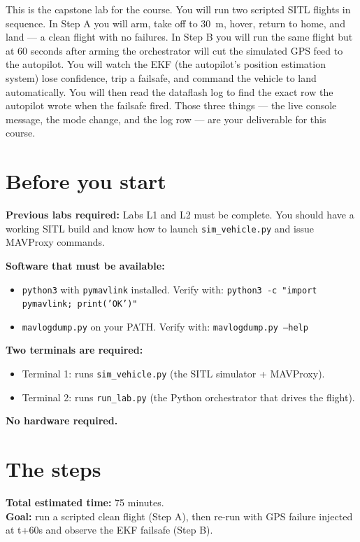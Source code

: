\documentclass[a4paper,11pt,twoside]{article}
\begin{document}
This is the capstone lab for the course. You will run two scripted SITL flights in sequence. In Step A you will arm, take off to 30~m, hover, return to home, and land --- a clean flight with no failures. In Step B you will run the same flight but at 60 seconds after arming the orchestrator will cut the simulated GPS feed to the autopilot. You will watch the EKF (the autopilot's position estimation system) lose confidence, trip a failsafe, and command the vehicle to land automatically. You will then read the dataflash log to find the exact row the autopilot wrote when the failsafe fired. Those three things --- the live console message, the mode change, and the log row --- are your deliverable for this course.

\section*{Before you start}

\textbf{Previous labs required:} Labs L1 and L2 must be complete. You should have a working SITL build and know how to launch \texttt{sim\_vehicle.py} and issue MAVProxy commands.

\textbf{Software that must be available:}
\begin{itemize}
  \item \texttt{python3} with \texttt{pymavlink} installed. Verify with: \texttt{python3 -c "import pymavlink; print('OK')"}
  \item \texttt{mavlogdump.py} on your PATH. Verify with: \texttt{mavlogdump.py --help}
\end{itemize}

\textbf{Two terminals are required:}
\begin{itemize}
  \item Terminal 1: runs \texttt{sim\_vehicle.py} (the SITL simulator + MAVProxy).
  \item Terminal 2: runs \texttt{run\_lab.py} (the Python orchestrator that drives the flight).
\end{itemize}

\textbf{No hardware required.}

\section*{The steps}

\textbf{Total estimated time:} 75 minutes.\\
\textbf{Goal:} run a scripted clean flight (Step A), then re-run with GPS failure injected at t+60s and observe the EKF failsafe (Step B).
\end{document}
